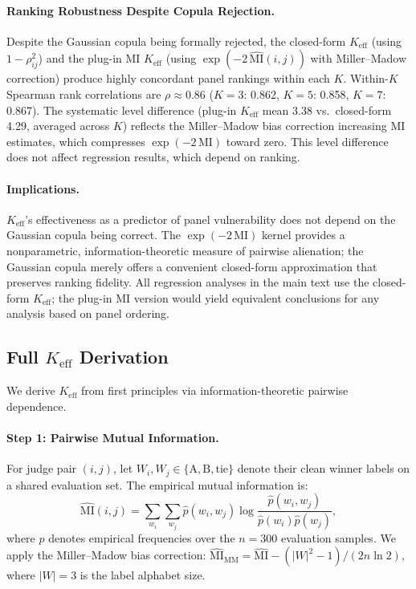 \paragraph{Ranking Robustness Despite Copula Rejection.} Despite the Gaussian copula being formally rejected, the closed-form $K_{\mathrm{eff}}$ (using $1 - \rho_{ij}^2$) and the plug-in MI $K_{\mathrm{eff}}$ (using $\exp(-2\,\widehat{\mathrm{MI}}(i,j))$ with Miller--Madow correction) produce highly concordant panel rankings within each $K$. Within-$K$ Spearman rank correlations are $\rho \approx 0.86$ ($K{=}3$: 0.862, $K{=}5$: 0.858, $K{=}7$: 0.867). The systematic level difference (plug-in $K_{\mathrm{eff}}$ mean 3.38 vs.\ closed-form 4.29, averaged across $K$) reflects the Miller--Madow bias correction increasing MI estimates, which compresses $\exp(-2\,\mathrm{MI})$ toward zero. This level difference does not affect regression results, which depend on ranking.

\paragraph{Implications.} $K_{\mathrm{eff}}$'s effectiveness as a predictor of panel vulnerability does not depend on the Gaussian copula being correct. The $\exp(-2\,\mathrm{MI})$ kernel provides a nonparametric, information-theoretic measure of pairwise alienation; the Gaussian copula merely offers a convenient closed-form approximation that preserves ranking fidelity. All regression analyses in the main text use the closed-form $K_{\mathrm{eff}}$; the plug-in MI version would yield equivalent conclusions for any analysis based on panel ordering.

\subsection{Full $K_{\mathrm{eff}}$ Derivation}
\label{app:keff_derivation}

We derive $K_{\mathrm{eff}}$ from first principles via information-theoretic pairwise dependence.

\paragraph{Step 1: Pairwise Mutual Information.} For judge pair $(i,j)$, let $W_i, W_j \in \{\text{A}, \text{B}, \text{tie}\}$ denote their clean winner labels on a shared evaluation set. The empirical mutual information is:
\begin{equation}
\widehat{\mathrm{MI}}(i,j) = \sum_{w_i} \sum_{w_j} \hat{p}(w_i, w_j) \log \frac{\hat{p}(w_i, w_j)}{\hat{p}(w_i)\hat{p}(w_j)},
\end{equation}
where $\hat{p}$ denotes empirical frequencies over the $n{=}300$ evaluation samples. We apply the Miller--Madow bias correction: $\widehat{\mathrm{MI}}_{\mathrm{MM}} = \widehat{\mathrm{MI}} - (|W|^2 - 1)/(2n\ln 2)$, where $|W|{=}3$ is the label alphabet size.

